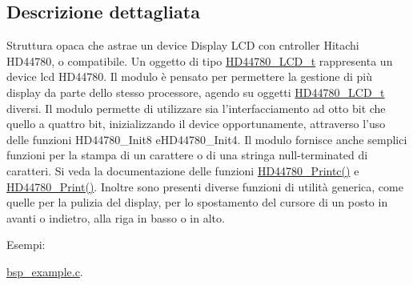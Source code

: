 \subsection{Descrizione dettagliata}
Struttura opaca che astrae un device Display L\+C\+D con cntroller Hitachi H\+D44780, o compatibile. Un oggetto di tipo \hyperlink{struct_h_d44780___l_c_d__t}{H\+D44780\+\_\+\+L\+C\+D\+\_\+t} rappresenta un device lcd H\+D44780. Il modulo è pensato per permettere la gestione di più display da parte dello stesso processore, agendo su oggetti \hyperlink{struct_h_d44780___l_c_d__t}{H\+D44780\+\_\+\+L\+C\+D\+\_\+t} diversi. Il modulo permette di utilizzare sia l'interfacciamento ad otto bit che quello a quattro bit, inizializzando il device opportunamente, attraverso l'uso delle funzioni H\+D44780\+\_\+\+Init8 e\+H\+D44780\+\_\+\+Init4. Il modulo fornisce anche semplici funzioni per la stampa di un carattere o di una stringa null-\/terminated di caratteri. Si veda la documentazione delle funzioni \hyperlink{group___h_d44780_ga57b8c6ca0b3c12e5f7273b3c373a6f17}{H\+D44780\+\_\+\+Printc()} e \hyperlink{group___h_d44780_ga3aedff8e2040e62db569fde955d3987b}{H\+D44780\+\_\+\+Print()}. Inoltre sono presenti diverse funzioni di utilità generica, come quelle per la pulizia del display, per lo spostamento del cursore di un posto in avanti o indietro, alla riga in basso o in alto. \begin{Desc}
\item[Esempi\+: ]\par
\hyperlink{bsp_example_8c-example}{bsp\+\_\+example.\+c}.\end{Desc}


